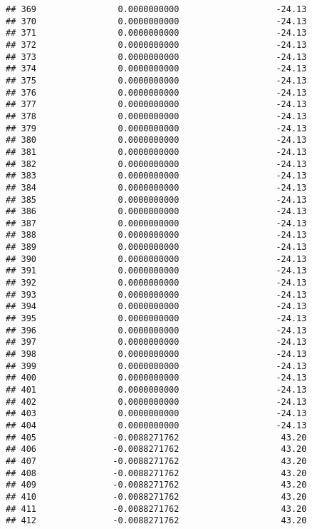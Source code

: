 \documentclass[]{article}
\begin{document}
\begin{verbatim}
## 369                0.0000000000                   -24.13
## 370                0.0000000000                   -24.13
## 371                0.0000000000                   -24.13
## 372                0.0000000000                   -24.13
## 373                0.0000000000                   -24.13
## 374                0.0000000000                   -24.13
## 375                0.0000000000                   -24.13
## 376                0.0000000000                   -24.13
## 377                0.0000000000                   -24.13
## 378                0.0000000000                   -24.13
## 379                0.0000000000                   -24.13
## 380                0.0000000000                   -24.13
## 381                0.0000000000                   -24.13
## 382                0.0000000000                   -24.13
## 383                0.0000000000                   -24.13
## 384                0.0000000000                   -24.13
## 385                0.0000000000                   -24.13
## 386                0.0000000000                   -24.13
## 387                0.0000000000                   -24.13
## 388                0.0000000000                   -24.13
## 389                0.0000000000                   -24.13
## 390                0.0000000000                   -24.13
## 391                0.0000000000                   -24.13
## 392                0.0000000000                   -24.13
## 393                0.0000000000                   -24.13
## 394                0.0000000000                   -24.13
## 395                0.0000000000                   -24.13
## 396                0.0000000000                   -24.13
## 397                0.0000000000                   -24.13
## 398                0.0000000000                   -24.13
## 399                0.0000000000                   -24.13
## 400                0.0000000000                   -24.13
## 401                0.0000000000                   -24.13
## 402                0.0000000000                   -24.13
## 403                0.0000000000                   -24.13
## 404                0.0000000000                   -24.13
## 405               -0.0088271762                    43.20
## 406               -0.0088271762                    43.20
## 407               -0.0088271762                    43.20
## 408               -0.0088271762                    43.20
## 409               -0.0088271762                    43.20
## 410               -0.0088271762                    43.20
## 411               -0.0088271762                    43.20
## 412               -0.0088271762                    43.20

\end{verbatim}
\end{document}

